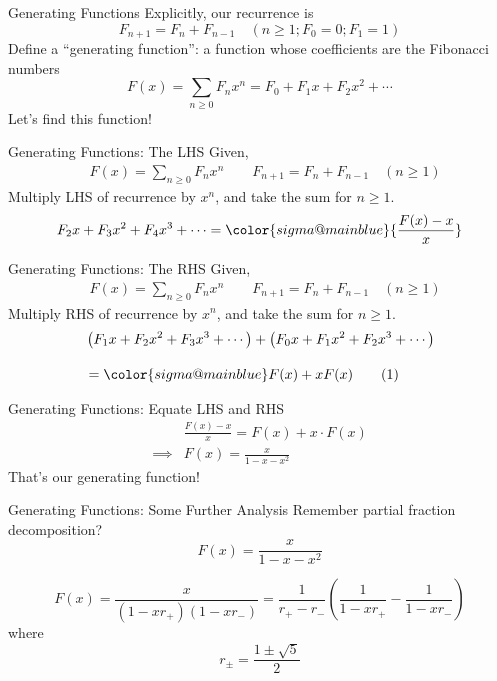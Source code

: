 \documentclass[aspectratio=169, handout]{beamer}
\begin{document}
\begin{frame}{Generating Functions}
    Explicitly, our recurrence is
    $$F_{n+1} = F_n + F_{n-1}\quad (n \geq 1; F_0 = 0; F_1 = 1)$$
    \pause
    Define a ``generating function'': a function whose coefficients are the Fibonacci numbers
    $$F(x) = \sum_{n\geq 0} F_n x^n = F_0 + F_1x + F_2x^2 + \cdots$$
    Let's find this function!
\end{frame}

\begin{frame}{Generating Functions: The LHS}
Given,
\begin{align*}
    &F(x) = \sum_{n\geq 0} F_n x^n\qquad
    F_{n+1} = F_n + F_{n-1}\quad (n \geq 1)
    \end{align*}\pause
     Multiply LHS of recurrence by $x^n$, and take the sum for $n \geq 1$.
     \begin{equation}
     F_2x + F_3x^2 + F_4x^3 + \cdots = {\color{sigma@mainblue} {\frac{F(x) - x}{x}}}
     \end{equation}
\end{frame}

\begin{frame}{Generating Functions: The RHS}
Given,
\begin{align*}
    &F(x) = \sum_{n\geq 0} F_n x^n\qquad
    F_{n+1} = F_n + F_{n-1}\quad (n \geq 1)
    \end{align*}\pause
     Multiply RHS of recurrence by $x^n$, and take the sum for $n \geq 1$.
     \begin{align*}
     &\left( F_1x + F_2x^2 + F_3x^3 + \cdots \right) + \left( F_0x + F_1x^2 + F_2x^3 + \cdots \right)\\[1em]
     &= {\color{sigma@mainblue} F(x) + xF(x)}{\addtocounter{equation}{1}\tag{\theequation}}
     \end{align*}
\end{frame}

\begin{frame}{Generating Functions: Equate LHS and RHS}
\begin{align*}
    &\frac{F(x) - x}{x} = F(x) + x \cdot F(x)\\[1em]
    \implies & F(x) = \frac{x}{1-x-x^2}
\end{align*}
That's our generating function!
\end{frame}

\begin{frame}{Generating Functions: Some Further Analysis}
    Remember partial fraction decomposition?
    $$F(x) = \frac{x}{1-x-x^2}$$
    \pause
    
    $$F(x) = \frac{x}{(1-xr_+)(1-xr_-)} = \frac{1}{r_+ - r_-}\left( 
        \frac{1}{1-xr_+} - \frac{1}{1-xr_-}
    \right)$$
    where
    $$r_\pm = \frac{1\pm \sqrt{5}}{2}$$
\end{frame}
\end{document}
